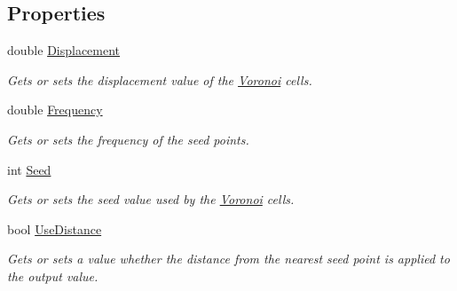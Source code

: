 \subsection*{Properties}
\begin{DoxyCompactItemize}
\item 
double \hyperlink{class_lib_noise_1_1_generator_1_1_voronoi_a8dc23a245cdd11b3e6d2cf39e8ed493c}{Displacement}
\begin{DoxyCompactList}\small\item\em Gets or sets the displacement value of the \hyperlink{class_lib_noise_1_1_generator_1_1_voronoi}{Voronoi} cells. \end{DoxyCompactList}\item 
double \hyperlink{class_lib_noise_1_1_generator_1_1_voronoi_a6843f85c47e5ada6a939f7ca61d9241a}{Frequency}
\begin{DoxyCompactList}\small\item\em Gets or sets the frequency of the seed points. \end{DoxyCompactList}\item 
int \hyperlink{class_lib_noise_1_1_generator_1_1_voronoi_a406e20c40c0d0dcd37574c2f641408e2}{Seed}
\begin{DoxyCompactList}\small\item\em Gets or sets the seed value used by the \hyperlink{class_lib_noise_1_1_generator_1_1_voronoi}{Voronoi} cells. \end{DoxyCompactList}\item 
bool \hyperlink{class_lib_noise_1_1_generator_1_1_voronoi_acf9fb92ce23125db3dc8187a41d4c022}{Use\+Distance}
\begin{DoxyCompactList}\small\item\em Gets or sets a value whether the distance from the nearest seed point is applied to the output value. \end{DoxyCompactList}\end{DoxyCompactItemize}
